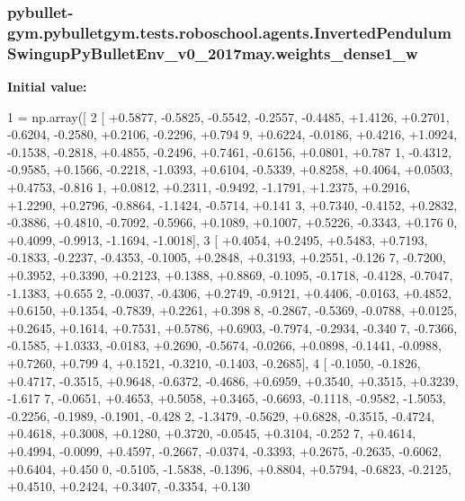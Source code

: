 \subsubsection[{\texorpdfstring{weights\+\_\+dense1\+\_\+w}{weights_dense1_w}}]{\setlength{\rightskip}{0pt plus 5cm}pybullet-\/gym.\+pybulletgym.\+tests.\+roboschool.\+agents.\+Inverted\+Pendulum\+Swingup\+Py\+Bullet\+Env\+\_\+v0\+\_\+2017may.\+weights\+\_\+dense1\+\_\+w}\hypertarget{namespacepybullet-gym_1_1pybulletgym_1_1tests_1_1roboschool_1_1agents_1_1_inverted_pendulum_swingup_py_bullet_env__v0__2017may_acc0cfa94e4d579a6ff0666051a028089}{}\label{namespacepybullet-gym_1_1pybulletgym_1_1tests_1_1roboschool_1_1agents_1_1_inverted_pendulum_swingup_py_bullet_env__v0__2017may_acc0cfa94e4d579a6ff0666051a028089}
{\bfseries Initial value\+:}
\begin{DoxyCode}
1 = np.array([
2 [ +0.5877, -0.5825, -0.5542, -0.2557, -0.4485, +1.4126, +0.2701, -0.6204, -0.2580, +0.2106, -0.2296, +0.794
      9, +0.6224, -0.0186, +0.4216, +1.0924, -0.1538, -0.2818, +0.4855, -0.2496, +0.7461, -0.6156, +0.0801, +0.787
      1, -0.4312, -0.9585, +0.1566, -0.2218, -1.0393, +0.6104, -0.5339, +0.8258, +0.4064, +0.0503, +0.4753, -0.816
      1, +0.0812, +0.2311, -0.9492, -1.1791, +1.2375, +0.2916, +1.2290, +0.2796, -0.8864, -1.1424, -0.5714, +0.141
      3, +0.7340, -0.4152, +0.2832, -0.3886, +0.4810, -0.7092, -0.5966, +0.1089, +0.1007, +0.5226, -0.3343, +0.176
      0, +0.4099, -0.9913, -1.1694, -1.0018],
3 [ +0.4054, +0.2495, +0.5483, +0.7193, -0.1833, -0.2237, -0.4353, -0.1005, +0.2848, +0.3193, +0.2551, -0.126
      7, -0.7200, +0.3952, +0.3390, +0.2123, +0.1388, +0.8869, -0.1095, -0.1718, -0.4128, -0.7047, -1.1383, +0.655
      2, -0.0037, -0.4306, +0.2749, -0.9121, +0.4406, -0.0163, +0.4852, +0.6150, +0.1354, -0.7839, +0.2261, +0.398
      8, -0.2867, -0.5369, -0.0788, +0.0125, +0.2645, +0.1614, +0.7531, +0.5786, +0.6903, -0.7974, -0.2934, -0.340
      7, -0.7366, -0.1585, +1.0333, -0.0183, +0.2690, -0.5674, -0.0266, +0.0898, -0.1441, -0.0988, +0.7260, +0.799
      4, +0.1521, -0.3210, -0.1403, -0.2685],
4 [ -0.1050, -0.1826, +0.4717, -0.3515, +0.9648, -0.6372, -0.4686, +0.6959, +0.3540, +0.3515, +0.3239, -1.617
      7, -0.0651, +0.4653, +0.5058, +0.3465, -0.6693, -0.1118, -0.9582, -1.5053, -0.2256, -0.1989, -0.1901, -0.428
      2, -1.3479, -0.5629, +0.6828, -0.3515, -0.4724, +0.4618, +0.3008, +0.1280, +0.3720, -0.0545, +0.3104, -0.252
      7, +0.4614, +0.4994, -0.0099, +0.4597, -0.2667, -0.0374, -0.3393, +0.2675, -0.2635, -0.6062, +0.6404, +0.450
      0, -0.5105, -1.5838, -0.1396, +0.8804, +0.5794, -0.6823, -0.2125, +0.4510, +0.2424, +0.3407, -0.3354, +0.130

\end{DoxyCode}
